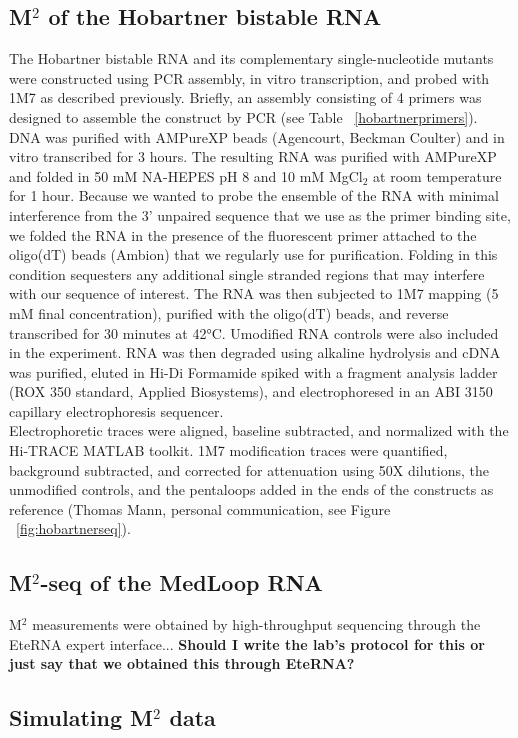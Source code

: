 \documentclass[12pt]{article}
\begin{document}
\subsection{M$^2$ of the Hobartner bistable RNA}

The Hobartner bistable RNA and its complementary single-nucleotide mutants were constructed using PCR assembly, in vitro transcription, and probed with 1M7 as described previously. Briefly, an assembly consisting of 4 primers was designed to assemble the construct by PCR (see Table ~\ref{hobartnerprimers}). DNA was purified with AMPureXP beads (Agencourt, Beckman Coulter) and in vitro transcribed for 3 hours. The resulting RNA was purified with AMPureXP and folded in 50 mM NA-HEPES pH 8 and 10 mM MgCl$_{2}$ at room temperature for 1 hour. Because we wanted to probe the ensemble of the RNA with minimal interference from the 3' unpaired sequence that we use as the primer binding site, we folded the RNA in the presence of the fluorescent primer attached to the oligo(dT) beads (Ambion) that we regularly use for purification. Folding in this condition sequesters any additional single stranded regions that may interfere with our sequence of interest. The RNA was then subjected to 1M7 mapping (5 mM final concentration), purified with the oligo(dT) beads, and reverse transcribed for 30 minutes at 42°C. Umodified RNA controls were also included in the experiment. RNA was then degraded using alkaline hydrolysis and cDNA was purified, eluted in Hi-Di Formamide spiked with a fragment analysis ladder (ROX 350 standard, Applied Biosystems), and electrophoresed in an ABI 3150 capillary electrophoresis sequencer. \\
Electrophoretic traces were aligned, baseline subtracted, and normalized with the Hi-TRACE MATLAB toolkit. 1M7 modification traces were quantified, background subtracted, and corrected for attenuation using 50X dilutions, the unmodified controls, and the pentaloops added in the ends of the constructs as reference (Thomas Mann, personal communication, see Figure ~\ref{fig:hobartnerseq}).

\subsection{M$^2$-seq of the MedLoop RNA}
M$^2$ measurements were obtained by high-throughput sequencing through the EteRNA expert interface... \textbf{Should I write the lab's protocol for this or just say that we obtained this through EteRNA?}

\subsection{Simulating M$^2$ data}
\end{document}
